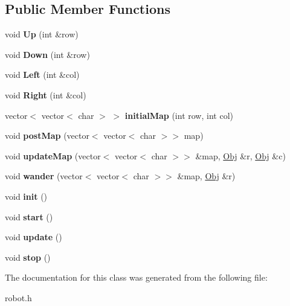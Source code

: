 \subsection*{Public Member Functions}
\begin{DoxyCompactItemize}
\item 
\hypertarget{classMap_a546e80c365e0ceda9c4ac3777d9648a5}{void {\bfseries Up} (int \&row)}\label{classMap_a546e80c365e0ceda9c4ac3777d9648a5}

\item 
\hypertarget{classMap_a767871d244385ace101d441d3e861be0}{void {\bfseries Down} (int \&row)}\label{classMap_a767871d244385ace101d441d3e861be0}

\item 
\hypertarget{classMap_a07d6a92d5e28921bc4cb85fab86e38d5}{void {\bfseries Left} (int \&col)}\label{classMap_a07d6a92d5e28921bc4cb85fab86e38d5}

\item 
\hypertarget{classMap_a27df7df3064192b2d88d6de45a1d3a4b}{void {\bfseries Right} (int \&col)}\label{classMap_a27df7df3064192b2d88d6de45a1d3a4b}

\item 
\hypertarget{classMap_aa804b353e131db3353887e4403bb7198}{vector$<$ vector$<$ char $>$ $>$ {\bfseries initial\+Map} (int row, int col)}\label{classMap_aa804b353e131db3353887e4403bb7198}

\item 
\hypertarget{classMap_a485f842fd1ccbedcee05eb0c16c10145}{void {\bfseries post\+Map} (vector$<$ vector$<$ char $>$$>$ map)}\label{classMap_a485f842fd1ccbedcee05eb0c16c10145}

\item 
\hypertarget{classMap_a78d03e2c885923d5694ac0ce45e39fe4}{void {\bfseries update\+Map} (vector$<$ vector$<$ char $>$$>$ \&map, \hyperlink{classObj}{Obj} \&r, \hyperlink{classObj}{Obj} \&c)}\label{classMap_a78d03e2c885923d5694ac0ce45e39fe4}

\item 
\hypertarget{classMap_a4fade8eb8d572b68d6f8085983a72f91}{void {\bfseries wander} (vector$<$ vector$<$ char $>$$>$ \&map, \hyperlink{classObj}{Obj} \&r)}\label{classMap_a4fade8eb8d572b68d6f8085983a72f91}

\item 
\hypertarget{classMap_ae3a387c6842c05596b004e2735b8cbf5}{void {\bfseries init} ()}\label{classMap_ae3a387c6842c05596b004e2735b8cbf5}

\item 
\hypertarget{classMap_acb55c5346f6e0948635a72d7071004ef}{void {\bfseries start} ()}\label{classMap_acb55c5346f6e0948635a72d7071004ef}

\item 
\hypertarget{classMap_ab12643cc3a8d5e48f566c1abb571e9bf}{void {\bfseries update} ()}\label{classMap_ab12643cc3a8d5e48f566c1abb571e9bf}

\item 
\hypertarget{classMap_ab8412a04e493f4efef5327ed86209317}{void {\bfseries stop} ()}\label{classMap_ab8412a04e493f4efef5327ed86209317}

\end{DoxyCompactItemize}


The documentation for this class was generated from the following file\+:\begin{DoxyCompactItemize}
\item 
robot.\+h\end{DoxyCompactItemize}
